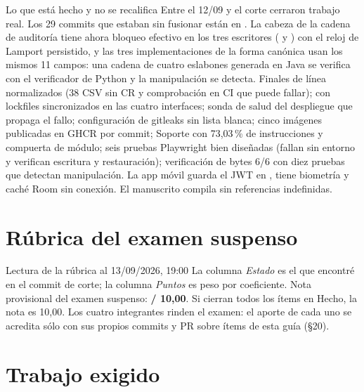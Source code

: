 \begin{logro}{Lo que est\'a hecho y no se recalifica}
Entre el 12/09 y el corte cerraron trabajo real. Los 29 commits que estaban sin fusionar est\'an en . La cabeza de la cadena de auditor\'ia tiene ahora bloqueo efectivo en los tres escritores ( y ) con el reloj de Lamport persistido, y las tres implementaciones de la forma can\'onica usan los mismos 11 campos: una cadena de cuatro eslabones generada en Java se verifica con el verificador de Python y la manipulaci\'on se detecta. Finales de l\'inea normalizados (38 CSV sin CR y comprobaci\'on en CI que puede fallar);  con lockfiles sincronizados en las cuatro interfaces; sonda de salud del despliegue que propaga el fallo; configuraci\'on de gitleaks sin lista blanca; cinco im\'agenes publicadas en GHCR por commit; Soporte con 73,03\,\% de instrucciones y compuerta de m\'odulo; seis pruebas Playwright bien dise\~nadas (fallan sin entorno y verifican escritura y restauraci\'on); verificaci\'on de bytes 6/6 con diez pruebas que detectan manipulaci\'on. La app m\'ovil guarda el JWT en , tiene biometr\'ia y cach\'e Room sin conexi\'on. El manuscrito compila sin referencias indefinidas.
\end{logro}

\section{R\'ubrica del examen suspenso}

\reglarubrica



\begin{nota}{Lectura de la r\'ubrica al 13/09/2026, 19:00}
La columna \emph{Estado} es el que encontr\'e en el commit de corte; la columna \emph{Puntos} es peso por coeficiente. Nota provisional del examen suspenso: \textbf{\notaprov{} / 10,00}. Si cierran todos los \'items en Hecho, la nota es 10,00. Los cuatro integrantes rinden el examen: el aporte de cada uno se acredita s\'olo con sus propios commits y PR sobre \'items de esta gu\'ia (\S20).
\end{nota}

\section{Trabajo exigido}

